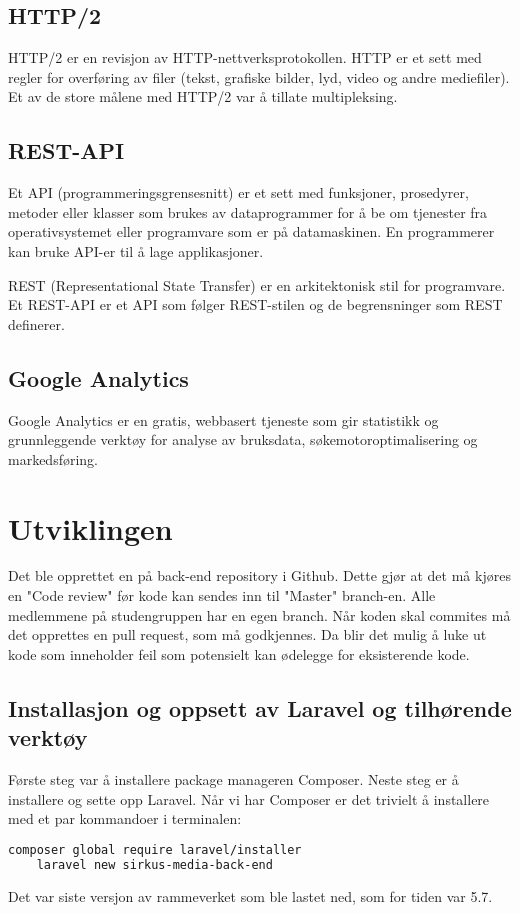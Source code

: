 \subsection{HTTP/2}
HTTP/2 \cite{Belshe2015httpv} er en revisjon av HTTP-nettverksprotokollen. HTTP er et sett med regler for overføring av filer (tekst, grafiske bilder, lyd, video og andre mediefiler). Et av de store målene med HTTP/2 var å tillate multipleksing.

\subsection{REST-API}
Et API (programmeringsgrensesnitt) er et sett med funksjoner, prosedyrer, metoder eller klasser som brukes av dataprogrammer for å be om tjenester fra operativsystemet eller programvare som er på datamaskinen. En programmerer kan bruke API-er til å lage applikasjoner.

REST (Representational State Transfer) er en arkitektonisk stil for programvare. Et REST-API \cite{Masse2011radr} er et API som følger REST-stilen og de begrensninger som REST definerer.

\subsection{Google Analytics}
\label{sec:google-analytics}
Google Analytics \cite{google2019gtk} er en gratis, webbasert tjeneste som gir statistikk og grunnleggende verktøy for analyse av bruksdata, søkemotoroptimalisering og markedsføring.

\section{Utviklingen}

Det ble opprettet en  på back-end repository i Github. Dette gjør at det må kjøres en "Code review" før kode kan sendes inn til "Master" branch-en. Alle medlemmene på studengruppen har en egen branch.
Når koden skal commites må det opprettes en pull request, som må godkjennes. Da blir det mulig å luke ut kode som inneholder feil som potensielt kan ødelegge for eksisterende kode.


\subsection{Installasjon og oppsett av Laravel og tilhørende verktøy}
Første steg var å installere package manageren Composer.
Neste steg er å installere og sette opp Laravel.
Når vi har Composer er det trivielt å installere med et par kommandoer i terminalen:
\begin{lstlisting}[caption={Installasjon av Laravel med Composer},language=bash]
    composer global require laravel/installer
    laravel new sirkus-media-back-end
\end{lstlisting}
Det var siste versjon av rammeverket som ble lastet ned, som for tiden var 5.7.

